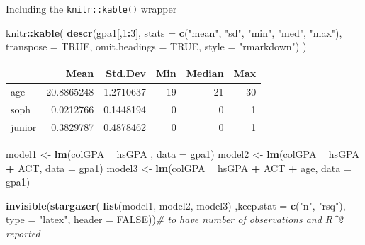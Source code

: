 \documentclass[]{book}
\newenvironment{Shaded}{\begin{snugshade}}{\end{snugshade}}
\newcommand{\CommentTok}[1]{\textcolor[rgb]{0.56,0.35,0.01}{\textit{#1}}}
\newcommand{\DataTypeTok}[1]{\textcolor[rgb]{0.13,0.29,0.53}{#1}}
\newcommand{\DecValTok}[1]{\textcolor[rgb]{0.00,0.00,0.81}{#1}}
\newcommand{\KeywordTok}[1]{\textcolor[rgb]{0.13,0.29,0.53}{\textbf{#1}}}
\newcommand{\NormalTok}[1]{#1}
\newcommand{\OperatorTok}[1]{\textcolor[rgb]{0.81,0.36,0.00}{\textbf{#1}}}
\newcommand{\OtherTok}[1]{\textcolor[rgb]{0.56,0.35,0.01}{#1}}
\newcommand{\StringTok}[1]{\textcolor[rgb]{0.31,0.60,0.02}{#1}}
\begin{document}
Including the \texttt{knitr::kable()} wrapper

\begin{Shaded}
\begin{Highlighting}[]
\NormalTok{knitr}\OperatorTok{::}\KeywordTok{kable}\NormalTok{(}
  \KeywordTok{descr}\NormalTok{(gpa1[,}\DecValTok{1}\OperatorTok{:}\DecValTok{3}\NormalTok{], }\DataTypeTok{stats =} \KeywordTok{c}\NormalTok{(}\StringTok{"mean"}\NormalTok{, }\StringTok{"sd"}\NormalTok{, }\StringTok{"min"}\NormalTok{, }\StringTok{"med"}\NormalTok{, }\StringTok{"max"}\NormalTok{), }\DataTypeTok{transpose =} \OtherTok{TRUE}\NormalTok{, }
        \DataTypeTok{omit.headings =} \OtherTok{TRUE}\NormalTok{, }\DataTypeTok{style =} \StringTok{"rmarkdown"}\NormalTok{)}
\NormalTok{)}
\end{Highlighting}
\end{Shaded}

\begin{tabular}{l|r|r|r|r|r}
\hline
  & Mean & Std.Dev & Min & Median & Max\\
\hline
age & 20.8865248 & 1.2710637 & 19 & 21 & 30\\
\hline
soph & 0.0212766 & 0.1448194 & 0 & 0 & 1\\
\hline
junior & 0.3829787 & 0.4878462 & 0 & 0 & 1\\
\hline
\end{tabular}

\begin{Shaded}
\begin{Highlighting}[]
\NormalTok{model1 <-}\StringTok{ }\KeywordTok{lm}\NormalTok{(colGPA }\OperatorTok{~}\StringTok{ }\NormalTok{hsGPA , }\DataTypeTok{data =}\NormalTok{ gpa1)}
\NormalTok{model2 <-}\StringTok{ }\KeywordTok{lm}\NormalTok{(colGPA }\OperatorTok{~}\StringTok{ }\NormalTok{hsGPA }\OperatorTok{+}\StringTok{ }\NormalTok{ACT, }\DataTypeTok{data =}\NormalTok{ gpa1)}
\NormalTok{model3 <-}\StringTok{ }\KeywordTok{lm}\NormalTok{(colGPA }\OperatorTok{~}\StringTok{ }\NormalTok{hsGPA }\OperatorTok{+}\StringTok{ }\NormalTok{ACT }\OperatorTok{+}\StringTok{ }\NormalTok{age, }\DataTypeTok{data =}\NormalTok{ gpa1)}
\end{Highlighting}
\end{Shaded}

\begin{Shaded}
\begin{Highlighting}[]
\KeywordTok{invisible}\NormalTok{(}\KeywordTok{stargazer}\NormalTok{(}
  \KeywordTok{list}\NormalTok{(model1, }
\NormalTok{       model2,}
\NormalTok{       model3)}
\NormalTok{  ,}\DataTypeTok{keep.stat =} \KeywordTok{c}\NormalTok{(}\StringTok{"n"}\NormalTok{, }\StringTok{"rsq"}\NormalTok{), }\DataTypeTok{type =} \StringTok{"latex"}\NormalTok{, }\DataTypeTok{header =} \OtherTok{FALSE}\NormalTok{))}\CommentTok{# to have number of observations and R^2 reported}
\end{Highlighting}
\end{Shaded}
\end{document}
